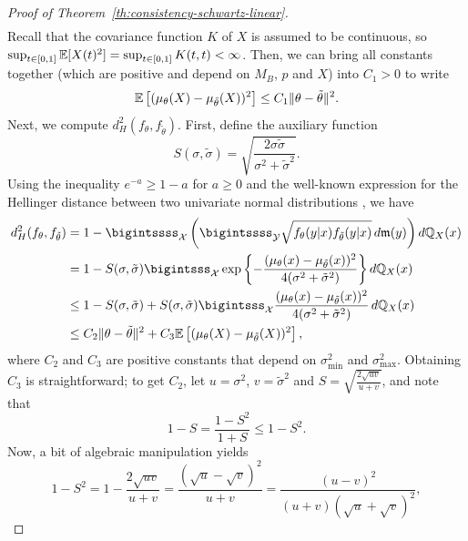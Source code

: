 \begin{proof}[Proof of Theorem~\ref{th:consistency-schwartz-linear}]
\begin{align*}
\end{align*}
Recall that the covariance function \(K\) of \(X\) is assumed to be continuous, so \(\sup_{t\in[0,1]} \mathbb{E}[X(t)^2]=\sup_{t\in[0,1]}K(t,t)<\infty\). Then, we can bring all constants together (which are positive and depend on \(M_B\), \(p\) and \(X\)) into \(C_1>0\) to write
\begin{equation}\label{eq:th9-bound1}
  \mathbb{E}\left[(\mu_\theta(X) - \mu_{\tilde\theta}(X))^2\right] \leq C_1 \|\theta - \tilde\theta\|^2.
\end{equation}
Next, we compute \(d^2_H(f_\theta, f_{\tilde\theta})\). First, define the auxiliary function
\[
  S(\sigma, \tilde\sigma)= \sqrt{\frac{2\sigma \tilde\sigma}{\sigma^2 + \tilde\sigma^2}}.
\]
Using the inequality \(e^{-a}\geq 1-a\) for \(a\geq 0\) and the well-known expression for the Hellinger distance between two univariate normal distributions \citep[e.g.][p.~51]{pardo2018statistical}, we have
\begin{equation}\label{eq:th9-bound2}
\begin{split}
  d^2_H(f_\theta, f_{\tilde\theta}) & = 1 - \bigintssss_{\mathcal X} \left(\bigintssss_{\mathcal Y}\sqrt{f_\theta(y|x) f_{\tilde\theta}(y|x)}\, d\mathfrak{m}(y)\right) d\qq_X(x)\\
  & = 1 - S(\sigma, \tilde\sigma)\bigintsss_{\mathcal X} \exp\left\{ -\frac{(\mu_\theta(x) - \mu_{\tilde\theta}(x))^2}{4(\sigma^2 + \tilde\sigma^2)} \right\} d\qq_X(x)                                         \\
  & \leq 1 - S(\sigma, \tilde\sigma) + S(\sigma, \tilde\sigma) \bigintsss_{\mathcal X} \frac{(\mu_\theta(x) - \mu_{\tilde\theta}(x))^2}{4(\sigma^2+\tilde\sigma^2)}\, d\qq_X(x) \\
  & \leq C_2\|\theta - \tilde\theta\|^2 + C_3 \E\left[(\mu_\theta(X) - \mu_{\tilde\theta}(X))^2\right],
\end{split}
\end{equation}
where \(C_2\) and \(C_3\) are positive constants that depend on \(\sigma^2_{\text{min}}\) and \(\sigma^2_{\text{max}}\). Obtaining \(C_3\) is straightforward; to get \(C_2\), let \(u=\sigma^2\), \(v=\tilde\sigma^2\) and \(S=\sqrt{\frac{2\sqrt{uv}}{u+v}}\), and note that
\[
  1-S = \frac{1-S^2}{1+S} \leq 1 - S^2.
\]
Now, a bit of algebraic manipulation yields
\begin{equation}\label{eq:th9-computation-S}
  1 - S^2 = 1 - \frac{2\sqrt{uv}}{u+v} = \frac{(\sqrt{u}-\sqrt{v})^2}{u+v} = \frac{(u-v)^2}{(u+v)(\sqrt{u} + \sqrt{v})^2},
\end{equation}

\end{proof}
